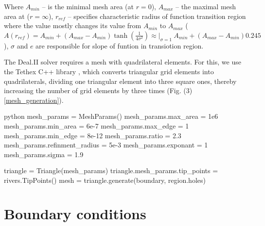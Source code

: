 \documentclass[]{pracamgr}
\begin{document}
      Where $A_{min}$ -- is the minimal mesh area (at $r = 0$), $A_{max}$ -- the maximal mesh area at ($r = \infty$), $r_{ref}$ -- specifies characteristic radius of function transition region where the value mostly changes its value from $A_{min}$ to $A_{max}$ ($A(r_{ref}) =  A_{min} + (A_{max} - A_{min}) \tanh(\frac{1}{4 \sigma^2}) \approx |_{\sigma = 1} \ A_{min} + (A_{max} - A_{min}) 0.245 $), $\sigma$ and $e$ are responsible for slope of funtion in transiotion region.

      The Deal.II\cite{dealII94} solver requires a mesh with quadrilateral elements. For this, we use the Tethex C++ library \cite{tethex} , which converts triangular grid elements into quadrilaterals, dividing one triangular element into three square ones, thereby increasing the number of grid elements by three times (Fig. (3) \ref{mesh_generation}).

      \begin{mintedbox}{python}
        mesh_params = MeshParams()
        mesh_params.max_area = 1e6
        mesh_params.min_area = 6e-7
        mesh_params.max_edge = 1
        mesh_params.min_edge = 8e-12
        mesh_params.ratio = 2.3
        mesh_params.refinment_radius = 5e-3
        mesh_params.exponant = 1
        mesh_params.sigma = 1.9
      
        triangle = Triangle(mesh_params)
        triangle.mesh_params.tip_points = rivers.TipPoints()
        mesh = triangle.generate(boundary, region.holes)\end{mintedbox}

    \section{Boundary conditions}
\end{document}
